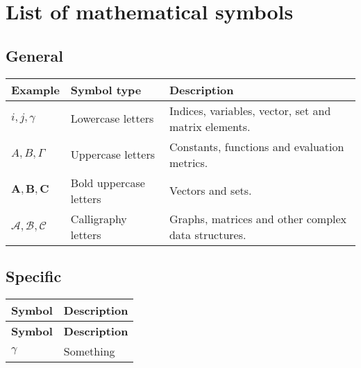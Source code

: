 \chapter[List of mathematical symbols]{List of mathematical symbols}


\section*{General}
\begin{tabular}{p{1.6cm}p{3.8cm}P{6.7cm}}
\toprule
\textbf{Example}    & \textbf{Symbol type}        & \textbf{Description} \\
\midrule
$i, j, \gamma$    & Lowercase letters  & Indices, variables, vector, set and matrix elements. \\
$A,B,\Gamma$    & Uppercase letters  & Constants, functions and evaluation metrics. \\
$\mathbf{A},\mathbf{B},\mathbf{C}$ & Bold uppercase letters & Vectors and sets. \\
$\mathcal{A},\mathcal{B},\mathcal{C}$ & Calligraphy letters & Graphs, matrices and other complex data structures. \\
\bottomrule
\end{tabular}
\vspace{0.3cm}

\section*{Specific}
\vspace{-0.3cm}
\begin{longtable}{p{1.4cm}p{11.1cm}}
\toprule
\textbf{Symbol}              & \textbf{Description} \\
\midrule
\endfirsthead
\textbf{Symbol}              & \textbf{Description} \\
\midrule
\endhead

\bottomrule
\endlastfoot

\bottomrule
\endfoot

$\gamma$ & Something\\
\end{longtable}

\vfill

